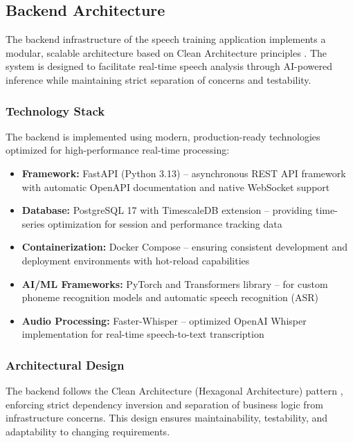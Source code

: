\subsection{Backend Architecture}
\label{subsec:backend-architecture}

The backend infrastructure of the speech training application implements a modular, scalable architecture based on Clean Architecture principles \cite{martin2017clean}. The system is designed to facilitate real-time speech analysis through AI-powered inference while maintaining strict separation of concerns and testability.

\subsubsection{Technology Stack}

The backend is implemented using modern, production-ready technologies optimized for high-performance real-time processing:

\begin{itemize}
    \item \textbf{Framework:} FastAPI (Python 3.13) -- asynchronous REST API framework with automatic OpenAPI documentation and native WebSocket support
    \item \textbf{Database:} PostgreSQL 17 with TimescaleDB extension -- providing time-series optimization for session and performance tracking data
    \item \textbf{Containerization:} Docker Compose -- ensuring consistent development and deployment environments with hot-reload capabilities
    \item \textbf{AI/ML Frameworks:} PyTorch and Transformers library -- for custom phoneme recognition models and automatic speech recognition (ASR)
    \item \textbf{Audio Processing:} Faster-Whisper -- optimized OpenAI Whisper implementation for real-time speech-to-text transcription
\end{itemize}

\subsubsection{Architectural Design}

The backend follows the Clean Architecture (Hexagonal Architecture) pattern \cite{cockburn2005hexagonal}, enforcing strict dependency inversion and separation of business logic from infrastructure concerns. This design ensures maintainability, testability, and adaptability to changing requirements.

